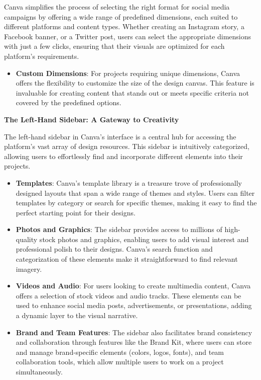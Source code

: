\documentclass[
]{book}
\providecommand{\tightlist}{%
  \setlength{\itemsep}{0pt}\setlength{\parskip}{0pt}}
\begin{document}
Canva simplifies the process of selecting the right format for social media campaigns by offering a wide range of predefined dimensions, each suited to different platforms and content types. Whether creating an Instagram story, a Facebook banner, or a Twitter post, users can select the appropriate dimensions with just a few clicks, ensuring that their visuals are optimized for each platform's requirements.

\begin{itemize}
\tightlist
\item
  \textbf{Custom Dimensions}: For projects requiring unique dimensions, Canva offers the flexibility to customize the size of the design canvas. This feature is invaluable for creating content that stands out or meets specific criteria not covered by the predefined options.
\end{itemize}

\textbf{The Left-Hand Sidebar: A Gateway to Creativity}

The left-hand sidebar in Canva's interface is a central hub for accessing the platform's vast array of design resources. This sidebar is intuitively categorized, allowing users to effortlessly find and incorporate different elements into their projects.

\begin{itemize}
\tightlist
\item
  \textbf{Templates}: Canva's template library is a treasure trove of professionally designed layouts that span a wide range of themes and styles. Users can filter templates by category or search for specific themes, making it easy to find the perfect starting point for their designs.
\item
  \textbf{Photos and Graphics}: The sidebar provides access to millions of high-quality stock photos and graphics, enabling users to add visual interest and professional polish to their designs. Canva's search function and categorization of these elements make it straightforward to find relevant imagery.
\item
  \textbf{Videos and Audio}: For users looking to create multimedia content, Canva offers a selection of stock videos and audio tracks. These elements can be used to enhance social media posts, advertisements, or presentations, adding a dynamic layer to the visual narrative.
\item
  \textbf{Brand and Team Features}: The sidebar also facilitates brand consistency and collaboration through features like the Brand Kit, where users can store and manage brand-specific elements (colors, logos, fonts), and team collaboration tools, which allow multiple users to work on a project simultaneously.
\end{itemize}
\end{document}
